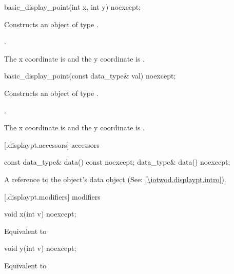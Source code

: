 %
\begin{itemdecl}
basic_display_point(int x, int y) noexcept;
\end{itemdecl}
\begin{itemdescr}
\pnum
\effects
Constructs an object of type .

\pnum
\postconditions
{}.

\pnum
\remarks
The x coordinate is  and the y coordinate is .
\end{itemdescr}

%
\begin{itemdecl}
basic_display_point(const data_type& val) noexcept;
\end{itemdecl}
\begin{itemdescr}
\pnum
\effects
Constructs an object of type .

\pnum
\postconditions
{}.

\pnum
\remarks
The x coordinate is  and the y coordinate is .
\end{itemdescr}

 [\iotwod.displaypt.accessors]{ accessors}

%
\begin{itemdecl}
const data_type& data() const noexcept;
data_type& data() noexcept;
\end{itemdecl}
\begin{itemdescr}
\pnum
\returns
A reference to the  object's data object (See: \ref{\iotwod.displaypt.intro}).
\end{itemdescr}

 [\iotwod.displaypt.modifiers]{ modifiers}

%
\begin{itemdecl}
void x(int v) noexcept;
\end{itemdecl}
\begin{itemdescr}
\pnum
\effects
Equivalent to 
\end{itemdescr}

%
\begin{itemdecl}
void y(int v) noexcept;
\end{itemdecl}
\begin{itemdescr}
\pnum
\effects
Equivalent to 
\end{itemdescr}

